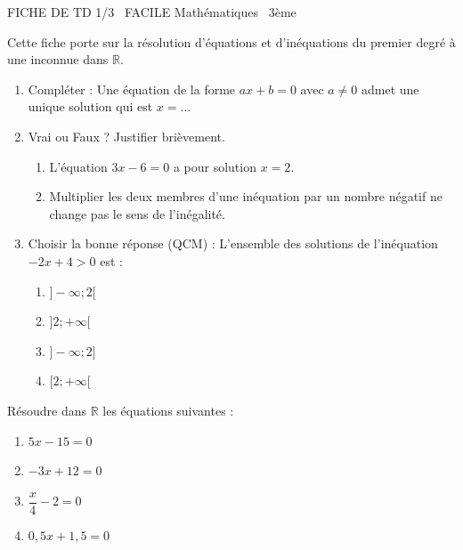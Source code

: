 \documentclass[11pt]{article}
\begin{document}
\begin{tcolorbox}[enhanced,colback=popink,colframe=popink,arc=10pt,boxrule=0pt,left=12pt,right=12pt,top=9pt,bottom=9pt]
{\color{white}\popxbold\small FICHE DE TD 1/3 \textbullet\ FACILE \hfill Mathématiques \textbullet\ 3ème\par}
\end{tcolorbox}
\vspace{4pt}
Cette fiche porte sur la résolution d'équations et d'inéquations du premier degré à une inconnue dans $\mathbb{R}$.

\begin{exercice}
\begin{enumerate}
    \item Compléter : Une équation de la forme $ax+b=0$ avec $a \neq 0$ admet une unique solution qui est $x = \dots$
    \item Vrai ou Faux ? Justifier brièvement.
    \begin{enumerate}
        \item L'équation $3x - 6 = 0$ a pour solution $x = 2$.
        \item Multiplier les deux membres d'une inéquation par un nombre négatif ne change pas le sens de l'inégalité.
    \end{enumerate}
    \item Choisir la bonne réponse (QCM) : L'ensemble des solutions de l'inéquation $-2x + 4 > 0$ est :
    \begin{enumerate}
        \item $]-\infty; 2[$
        \item $]2; +\infty[$
        \item $]-\infty; 2]$
        \item $[2; +\infty[$
    \end{enumerate}
\end{enumerate}
\end{exercice}

\begin{exercice}
Résoudre dans $\mathbb{R}$ les équations suivantes :
\begin{enumerate}
    \item $5x - 15 = 0$
    \item $-3x + 12 = 0$
    \item $\dfrac{x}{4} - 2 = 0$
    \item $0,5x + 1,5 = 0$
\end{enumerate}
\end{exercice}
\end{document}
